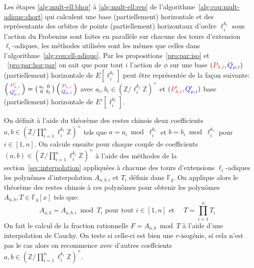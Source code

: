 \documentclass[10pt,a4paper]{book}
\theoremstyle{plain}
\theoremstyle{definition}
\theoremstyle{definition}
\theoremstyle{definition}
\theoremstyle{definition}
\theoremstyle{remark}
\theoremstyle{remark}
\theoremstyle{definition}
\begin{document}
Les étapes \ref{alg:mult-ell:bhor} à \ref{alg:mult-ell:rep} de 
l'algorithme~\ref{alg:cou:mult-adique:short} qui calculent une base (partiellement) 
horizontale et des représentants des orbites de points (partiellement) 
horizontaux d'ordre $\ell_i^{k_i}$ sous l'action du Frobenius sont faites en 
parallèle sur chacune des tours d'extension $\ell_i$-adiques, les méthodes 
utilisées sont les mêmes que celles dans l'algorithme~\ref{alg:cou:ell-adique}.
Par les propositions~\ref{pro:par:iso} et ~\ref{pro:par:hor:par} on sait
 que pour tout $i$ l'action de $\phi$ sur une base
$(\color{red}P_{\lambda,i}\color{black},\color{blue}Q_{\mu,i}\color{black})$
 (partiellement) horizontale de $E[\ell_i^{k_i}]$ peut être représentée de la façon suivante:
$
\left(\begin{smallmatrix}
\color{red} P'_{\lambda,i} \\
\color{blue} Q'_{\mu,i} \color{black}
\end{smallmatrix} \right)= \left(\begin{smallmatrix}
a_i & 0 \\
0 & b_i\end{smallmatrix} \right)
\left(\begin{smallmatrix}
\color{red} P_{\lambda,i} \\
\color{blue} Q_{\mu,i} \color{black} \end{smallmatrix} \right)$
avec $ a_i,b_i \in \left( \mathbb{Z}/\ell_i^{k_i}\mathbb{Z} \right)^{\times}$ et 
$(\color{red}P'_{\lambda,i}\color{black},\color{blue}Q'_{\mu,i}\color{black})$
base (partiellement) horizontale de $E'[\ell_i^{k_i}]$.

On définit à l'aide du théorème des restes chinois deux coefficients $a,b \in 
\left( \mathbb{Z}/\prod_{i=1}^n\ell_i^{k_i} \mathbb{Z} \right)^{\times}$ tels que 
$a=a_i \bmod \ell_i^{k_i}$ et $b=b_i \bmod \ell_i^{k_i}$ pour $i\in [1,n]$.
On calcule ensuite pour chaque couple de coefficients 
$(a,b) \in (\mathbb{Z}/\prod_{i=1}^n\ell_i^{k_i}\mathbb{Z})^{\times}$ à l'aide des 
méthodes de la section~\ref{sec:interpolation} appliquées
à chacune des tours d'extensions $\ell_i$-adiques les polynômes 
d'interpolation $A_{a,b,i}$ et $T_i$ définis dans $\mathbb{F}_q$.
 On applique alors le théorème des restes chinois à ces polynômes pour obtenir 
 les polynômes $A_{a,b},T \in \mathbb{F}_q[x]$ tels que:
 \[
A_{a,b}=A_{a,b,i} \bmod T_i \text{ pour tout } i \in [1,n] \text{ et } \quad T=\prod_{i=1}^nT_i 
 \]
On fait le calcul de la fraction rationnelle $F=A_{a,b} \bmod T$ à l'aide d'une
interpolation de Cauchy. On teste si celle-ci est bien une $r$-isogénie,
si cela n'est pas le cas alors on recommence avec d'autres coeffcients $a,b \in 
(\mathbb{Z}/\prod_{i=1}^n\ell_i^{k_i} \mathbb{Z})^{\times}$.
\end{document}
